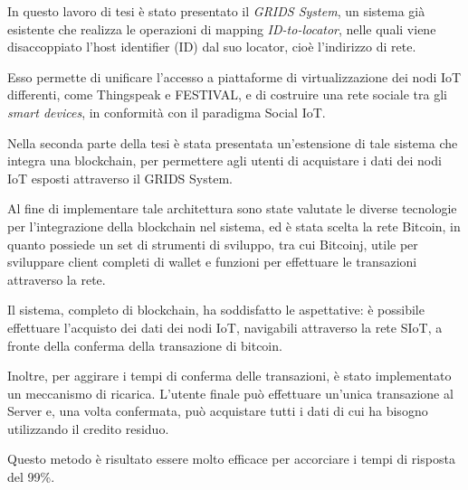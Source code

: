 In questo lavoro di tesi è stato presentato il \textit{GRIDS System}, un sistema già esistente che realizza le operazioni di mapping \textit{ID-to-locator}, nelle quali viene disaccoppiato l'host identifier (ID) dal suo locator, cioè l'indirizzo di rete.

Esso permette di unificare l'accesso a piattaforme di virtualizzazione dei nodi IoT differenti, come Thingspeak e FESTIVAL, e di costruire una rete sociale tra gli \textit{smart devices}, in conformità con il paradigma Social IoT.

Nella seconda parte della tesi è stata presentata un'estensione di tale sistema che integra una blockchain, per permettere agli utenti di acquistare i dati dei nodi IoT esposti attraverso il GRIDS System.

Al fine di implementare tale architettura sono state valutate le diverse tecnologie per l'integrazione della blockchain nel sistema, ed è stata scelta la rete Bitcoin, in quanto possiede un set di strumenti di sviluppo, tra cui Bitcoinj, utile per sviluppare client completi di wallet e funzioni per effettuare le transazioni attraverso la rete.

Il sistema, completo di blockchain, ha soddisfatto le aspettative: è possibile effettuare l'acquisto dei dati dei nodi IoT, navigabili attraverso la rete SIoT, a fronte della conferma della transazione di bitcoin. 

Inoltre, per aggirare i tempi di conferma delle transazioni, è stato implementato un meccanismo di ricarica. L'utente finale può effettuare un'unica transazione al Server e, una volta confermata, può acquistare tutti i dati di cui ha bisogno utilizzando il credito residuo. 

Questo metodo è risultato essere molto efficace per accorciare i tempi di risposta del 99\%.

